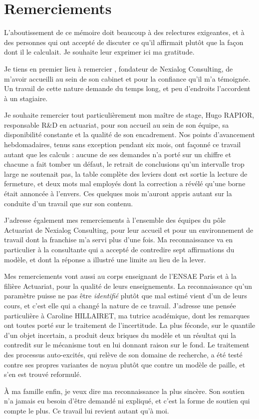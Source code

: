 \chapter*{Remerciements}

L'aboutissement de ce mémoire doit beaucoup à des relectures exigeantes, et à des
personnes qui ont accepté de discuter ce qu'il affirmait plutôt que la façon dont il le
calculait. Je souhaite leur exprimer ici ma gratitude.

Je tiens en premier lieu à remercier \fondateurnexialog, fondateur de Nexialog
Consulting, de m'avoir accueilli au sein de son cabinet et pour la confiance qu'il m'a
témoignée. Un travail de cette nature demande du temps long, et peu d'endroits
l'accordent à un stagiaire.

Je souhaite remercier tout particulièrement mon maître de stage, Hugo RAPIOR,
responsable R\&D en actuariat, pour son accueil au sein de son équipe, sa disponibilité
constante et la qualité de son encadrement. Nos points d'avancement hebdomadaires, tenus
sans exception pendant six mois, ont façonné ce travail autant que les calculs : aucune
de ses demandes n'a porté sur un chiffre et chacune a fait tomber un défaut, le retrait
de conclusions qu'un intervalle trop large ne soutenait pas, la table complète des
leviers dont est sortie la lecture de fermeture, et deux mots mal employés dont la
correction a révélé qu'une borne était annoncée à l'envers. Ces quelques mois m'auront
appris autant sur la conduite d'un travail que sur son contenu.

J'adresse également mes remerciements à l'ensemble des équipes du pôle Actuariat de
Nexialog Consulting, pour leur accueil et pour un environnement de travail dont la
franchise m'a servi plus d'une fois. Ma reconnaissance va en particulier à la consultante
qui a accepté de contredire sept affirmations du modèle, et dont la réponse a illustré
une limite au lieu de la lever.

Mes remerciements vont aussi au corps enseignant de l'ENSAE Paris et à la filière
Actuariat, pour la qualité de leurs enseignements. La reconnaissance qu'un paramètre
puisse ne pas être \emph{identifié} plutôt que mal estimé vient d'un de leurs cours, et
c'est elle qui a changé la nature de ce travail. J'adresse une pensée particulière à
Caroline HILLAIRET, ma tutrice académique, dont les remarques ont toutes porté sur le
traitement de l'incertitude. La plus féconde, sur le quantile d'un objet incertain, a
produit deux briques du modèle et un résultat qui la contredit sur le mécanisme tout en
lui donnant raison sur le fond. Le traitement des processus auto-excités, qui relève de
son domaine de recherche, a été testé contre ses propres variantes de noyau plutôt que
contre un modèle de paille, et s'en est trouvé reformulé.

À ma famille enfin, je veux dire ma reconnaissance la plus sincère. Son soutien n'a
jamais eu besoin d'être demandé ni expliqué, et c'est la forme de soutien qui compte le
plus. Ce travail lui revient autant qu'à moi.

\clearpage
